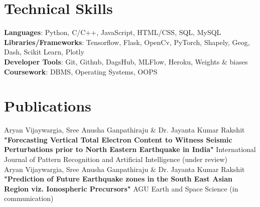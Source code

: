 \documentclass[letterpaper,11pt]{article}
\begin{document}
\section{Technical Skills}
 \begin{itemize}[leftmargin=0.15in, label={}]
    \small{\item{
     \textbf{Languages}{: Python, C/C++, JavaScript, HTML/CSS, SQL, MySQL} \\
    \vspace{2pt}    
     \textbf{Libraries/Frameworks}{: Tensorflow, Flask, OpenCv, PyTorch, Shapely, Geog, Dash, Scikit Learn, Plotly} \\
     \vspace{2pt}  
     \textbf{Developer Tools}{: Git, Github, DagsHub, MLFlow, Heroku, Weights \& biases} \\
     \vspace{2pt}
     \textbf{Coursework}{: DBMS, Operating Systems, OOPS}
    }}
 \end{itemize}
 \vspace{-16pt}
\section{Publications}
\begin{itemize}[leftmargin=0.15in, label={}]
    \small{\item{
    {Aryan Vijaywargia, Sree Anusha Ganpathiraju \& Dr. Jayanta Kumar Rakshit \textbf{"Forecasting Vertical Total Electron Content to Witness Seismic Perturbations prior to North Eastern Earthquake in India"} International Journal of Pattern Recognition and Artificial Intelligence} {(under review)} {}\\
    \vspace{3pt}
    {Aryan Vijaywargia, Sree Anusha Ganpathiraju \& Dr. Jayanta Kumar Rakshit \textbf{"Prediction of Future Earthquake zones in the South East Asian Region viz. Ionospheric Precursors"} AGU Earth and Space Science} {(in communication)}{}
}}
 \end{itemize}

\end{document}
